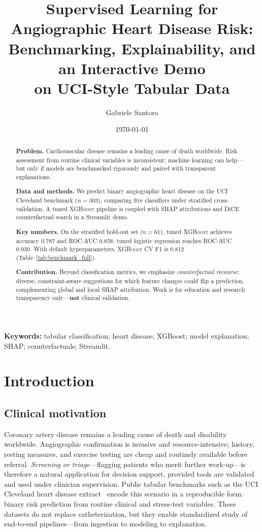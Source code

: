 \documentclass[11pt,a4paper]{article}
\title{Supervised Learning for Angiographic Heart Disease Risk:\\
  Benchmarking, Explainability, and an Interactive Demo\\
  on UCI-Style Tabular Data}
\author[1]{Gabriele Santoro}
\affil[1]{Heart Risk Advisor repository\texorpdfstring{\\}{: }%
\texttt{heart-risk-advisor}}
\date{\today}
\begin{document}
\maketitle

\begin{abstract}
\textbf{Problem.} Cardiovascular disease remains a leading cause of death worldwide. Risk assessment from routine clinical variables is inconsistent; machine learning can help—but only if models are benchmarked rigorously and paired with transparent explanations.

\textbf{Data and methods.} We predict binary angiographic heart disease on the UCI Cleveland benchmark ($n=303$), comparing five classifiers under stratified cross-validation. A tuned \textsc{XGBoost} pipeline is coupled with SHAP attributions and DiCE counterfactual search in a Streamlit demo.

\textbf{Key numbers.} On the stratified hold-out set ($n=61$), tuned \textsc{XGBoost} achieves accuracy \num{0.787} and ROC-AUC \num{0.858}; tuned logistic regression reaches ROC-AUC \num{0.930}. With default hyperparameters, \textsc{XGBoost} CV F1 is \num{0.812} (Table~\ref{tab:benchmark_full}).

\textbf{Contribution.} Beyond classification metrics, we emphasize \emph{counterfactual recourse}: diverse, constraint-aware suggestions for which feature changes could flip a prediction, complementing global and local SHAP attribution. Work is for education and research transparency only—\textbf{not} clinical validation.
\end{abstract}

\noindent\textbf{Keywords:} tabular classification; heart disease; XGBoost; model explanation; SHAP; counterfactuals; Streamlit.

\setcounter{tocdepth}{3}
\tableofcontents
\newpage

\section{Introduction}

\subsection{Clinical motivation}

Coronary artery disease remains a leading cause of death and disability worldwide. Angiographic confirmation is invasive and resource-intensive; history, resting measures, and exercise testing are cheap and routinely available before referral. \emph{Screening or triage}—flagging patients who merit further work-up—is therefore a natural application for decision support, provided tools are validated and used under clinician supervision. Public tabular benchmarks such as the UCI Cleveland heart disease extract~\cite{uci,detrano} encode this scenario in a reproducible form: binary risk prediction from routine clinical and stress-test variables. These datasets do not replace catheterization, but they enable standardized study of end-to-end pipelines—from ingestion to modeling to explanation.
\end{document}
